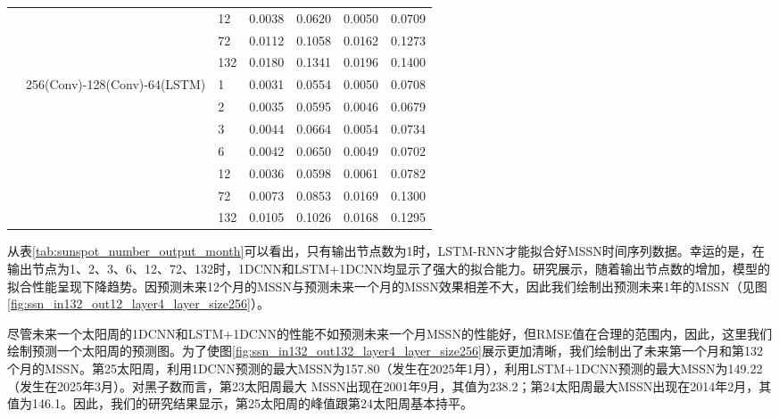 \begin{table}[!htbp]
{\begin{tabular}{lllllll}
        & & 12 & 0.0038 & 0.0620 & 0.0050 & 0.0709 \\
        & & 72 & 0.0112 & 0.1058 & 0.0162 & 0.1273 \\
        & & 132 & 0.0180 & 0.1341 & 0.0196 & 0.1400 \\
        & 256(Conv)-128(Conv)-64(LSTM) & 1 & 0.0031 & 0.0554 & 0.0050 & 0.0708 \\
        & & 2 & 0.0035 & 0.0595 & 0.0046 & 0.0679 \\
        & & 3 & 0.0044 & 0.0664 & 0.0054 & 0.0734 \\
        & & 6 & 0.0042 & 0.0650 & 0.0049 & 0.0702 \\
        & & 12 & 0.0036 & 0.0598 & 0.0061 & 0.0782 \\
        & & 72 & 0.0073 & 0.0853 & 0.0169 & 0.1300 \\
        & & 132 & 0.0105 & 0.1026 & 0.0168 & 0.1295 \\
        \bottomrule
    \end{tabular}}
\end{table}

从表\ref{tab:sunspot_number_output_month}可以看出，只有输出节点数为1时，LSTM-RNN才能拟合好MSSN时间序列数据。幸运的是，在输出节点为1、2、3、6、12、72、132时，1DCNN和LSTM+1DCNN均显示了强大的拟合能力。研究展示，随着输出节点数的增加，模型的拟合性能呈现下降趋势。因预测未来12个月的MSSN与预测未来一个月的MSSN效果相差不大，因此我们绘制出预测未来1年的MSSN（见图\ref{fig:ssn_in132_out12_layer4_layer_size256}）。


尽管未来一个太阳周的1DCNN和LSTM+1DCNN的性能不如预测未来一个月MSSN的性能好，但RMSE值在合理的范围内，因此，这里我们绘制预测一个太阳周的预测图。为了使图\ref{fig:ssn_in132_out132_layer4_layer_size256}展示更加清晰，我们绘制出了未来第一个月和第132个月的MSSN。第25太阳周，利用1DCNN预测的最大MSSN为157.80（发生在2025年1月），利用LSTM+1DCNN预测的最大MSSN为149.22（发生在2025年3月）。对黑子数而言，第23太阳周最大 MSSN出现在2001年9月，其值为238.2；第24太阳周最大MSSN出现在2014年2月，其值为146.1。因此，我们的研究结果显示，第25太阳周的峰值跟第24太阳周基本持平。 

